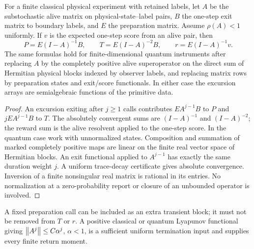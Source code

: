 \begin{lemma}\label{lem:resolvent}
For a finite classical physical experiment with retained labels, let $A$ be the substochastic alive matrix on physical-state--label pairs, $B$ the one-step exit matrix to boundary labels, and $E$ the preparation matrix. Assume $\rho(A)<1$ uniformly. If $v$ is the expected one-step score from an alive pair, then
\begin{equation}\label{eq:resolvents}
 P=E(I-A)^{-1}B,\qquad
 T=E(I-A)^{-2}B,\qquad
 r=E(I-A)^{-1}v.
\end{equation}
The same formulas hold for finite-dimensional quantum instruments after replacing $A$ by the completely positive alive superoperator on the direct sum of Hermitian physical blocks indexed by observer labels, and replacing matrix rows by preparation states and exit/score functionals. In either case the excursion arrays are semialgebraic functions of the primitive data.
\end{lemma}
\begin{proof}
An excursion exiting after $j\ge1$ calls contributes $EA^{j-1}B$ to $P$ and $jEA^{j-1}B$ to $T$. The absolutely convergent sums are $(I-A)^{-1}$ and $(I-A)^{-2}$; the reward sum is the alive resolvent applied to the one-step score. In the quantum case work with unnormalized states. Composition and summation of marked completely positive maps are linear on the finite real vector space of Hermitian blocks. An exit functional applied to $A^{j-1}$ has exactly the same duration weight $j$. A uniform trace-decay certificate gives absolute convergence. Inversion of a finite nonsingular real matrix is rational in its entries. No normalization at a zero-probability report or closure of an unbounded operator is involved.
\end{proof}
A fixed preparation call can be included as an extra transient block; it must not be removed from $T$ or $r$. A positive classical or quantum Lyapunov functional giving $\left\lVert A^j\right\rVert\le C\alpha^j$, $\alpha<1$, is a sufficient uniform termination input and supplies every finite return moment.

